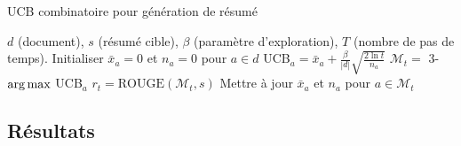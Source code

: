 \begin{algorithm}
    \caption{UCB combinatoire pour génération de résumé}
    \begin{algorithmic}[1]
        \Require $d$ (document), $s$ (résumé cible), $\beta$ (paramètre d'exploration), $T$ (nombre de pas de temps).
        \State Initialiser $\bar{x}_a =0$ et $n_a = 0$ pour $a \in d$
        \State UCB$_a = \bar{x}_a + \frac{\beta}{|d|} \sqrt{\frac{2 \ln t}{n_a}}$
        \EndFor
        \State $\mathcal{M}_t =$ 3-$\operatorname*{arg\,max}$ UCB$_a$
        \State $r_t = \text{ROUGE}(\mathcal{M}_t, s)$
        \State Mettre à jour $\bar{x}_a$ et $n_a$ pour {$a \in \mathcal{M}_t$}
        \EndFor
    \end{algorithmic}
    \label{alg:cible_ucb}
\end{algorithm}

\subsection{Résultats}
\label{subsec:ucb_resultats}


